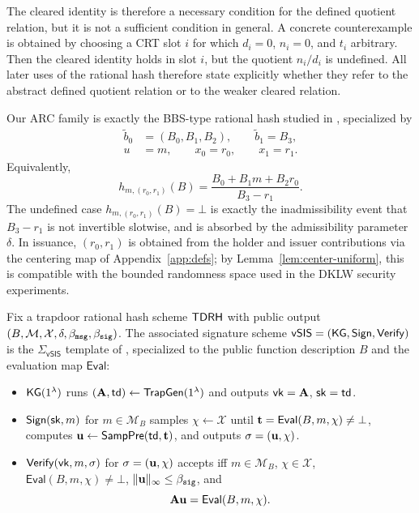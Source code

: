 \begin{remark}\label{rem:hash-cleared-not-sufficient}
The cleared identity is therefore a necessary condition for the defined quotient relation, but it is not a sufficient
condition in general. A concrete counterexample is obtained by choosing a CRT slot \(i\) for which \(d_i=0\),
\(n_i=0\), and \(t_i\) arbitrary. Then the cleared identity holds in slot \(i\), but the quotient \(n_i/d_i\) is
undefined. All later uses of the rational hash therefore state explicitly whether they refer to the abstract defined
quotient relation or to the weaker cleared relation.
\end{remark}

\begin{remark}\label{rem:hash-notation-match}
Our ARC family is exactly the BBS-type rational hash studied in \cite[Table~1]{EPRINT:DKLW25}, specialized by
\[
\begin{aligned}
  \tilde b_0&=(B_0,B_1,B_2),\qquad \tilde b_1=B_3,\\
  u&=m,\qquad x_0=r_0,\qquad x_1=r_1.
\end{aligned}
\]
Equivalently,
\[
  h_{m,(r_0,r_1)}(B)
  =\frac{B_0+B_1m+B_2r_0}{B_3-r_1}.
\]
The undefined case \(h_{m,(r_0,r_1)}(B)=\bot\) is exactly the inadmissibility event that \(B_3-r_1\) is not invertible
slotwise, and is absorbed by the admissibility parameter \(\delta\). In issuance, \((r_0,r_1)\) is obtained from the
holder and issuer contributions via the centering map of Appendix~\ref{app:defs}; by
Lemma~\ref{lem:center-uniform}, this is compatible with the bounded randomness space used in the DKLW security
experiments.
\end{remark}

\begin{definition}\label{def:vsis-template}
Fix a trapdoor rational hash scheme \(\mathsf{TDRH}\) with public output
\((B,\mathcal{M},\mathcal{X},\delta,\beta_{\mathtt{msg}},\beta_{\mathtt{sig}})\). The associated signature scheme
\(\mathsf{vSIS}=(\mathsf{KG},\mathsf{Sign},\mathsf{Verify})\) is the \(\Sigma_{\mathsf{vSIS}}\) template of
\cite[Figure~4 and Section~4.1]{EPRINT:DKLW25}, specialized to the public function description \(B\) and the
evaluation map \(\mathsf{Eval}\):
\begin{itemize}[leftmargin=1.25em]
  \item \(\mathsf{KG}(1^\lambda)\) runs \((\mathbf{A},\mathsf{td})\gets \mathsf{TrapGen}(1^\lambda)\) and outputs
  \(\mathsf{vk}=\mathbf{A}\), \(\mathsf{sk}=\mathsf{td}\).
  \item \(\mathsf{Sign}(\mathsf{sk},m)\) for \(m\in\mathcal{M}_B\) samples \(\chi\gets\mathcal{X}\) until
  \(\mathbf{t}=\mathsf{Eval}(B,m,\chi)\neq\bot\), computes \(\mathbf{u}\gets \mathsf{SampPre}(\mathsf{td},\mathbf{t})\), and outputs
  \(\sigma=(\mathbf{u},\chi)\).
  \item \(\mathsf{Verify}(\mathsf{vk},m,\sigma)\) for \(\sigma=(\mathbf{u},\chi)\) accepts iff \(m\in\mathcal{M}_B\),
  \(\chi\in\mathcal{X}\), \(\mathsf{Eval}(B,m,\chi)\neq\bot\), \(\|\mathbf{u}\|_\infty\le \beta_{\mathtt{sig}}\), and
  \[
    \mathbf{A}\mathbf{u}=\mathsf{Eval}(B,m,\chi).
  \]
\end{itemize}
\end{definition}

